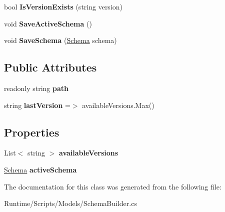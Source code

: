 \begin{DoxyCompactItemize}
bool {\bfseries Is\+Version\+Exists} (string version)
\item 
\mbox{\label{class_d_g_tools_1_1_database_1_1_schema_builder_a2045ed98663da0b8ee916312a54be068}} 
void {\bfseries Save\+Active\+Schema} ()
\item 
\mbox{\label{class_d_g_tools_1_1_database_1_1_schema_builder_aae993a4c832fb183ab8f4cf97c031e8b}} 
void {\bfseries Save\+Schema} (\mbox{\hyperlink{class_d_g_tools_1_1_database_1_1_schema}{Schema}} schema)
\end{DoxyCompactItemize}
\subsection*{Public Attributes}
\begin{DoxyCompactItemize}
\item 
\mbox{\label{class_d_g_tools_1_1_database_1_1_schema_builder_a690f6c686acdd1d98784cce924000ffb}} 
readonly string {\bfseries path}
\item 
\mbox{\label{class_d_g_tools_1_1_database_1_1_schema_builder_aae1bc924e123ac080407e9c482edc392}} 
string {\bfseries last\+Version} =$>$ available\+Versions.\+Max()
\end{DoxyCompactItemize}
\subsection*{Properties}
\begin{DoxyCompactItemize}
\item 
\mbox{\label{class_d_g_tools_1_1_database_1_1_schema_builder_ab65dce527d4aa79a911885269e9d123c}} 
List$<$ string $>$ {\bfseries available\+Versions}
\item 
\mbox{\label{class_d_g_tools_1_1_database_1_1_schema_builder_a160a44bb850795d73523f445d1005cbc}} 
\mbox{\hyperlink{class_d_g_tools_1_1_database_1_1_schema}{Schema}} {\bfseries active\+Schema}
\end{DoxyCompactItemize}


The documentation for this class was generated from the following file\+:\begin{DoxyCompactItemize}
\item 
Runtime/\+Scripts/\+Models/Schema\+Builder.\+cs\end{DoxyCompactItemize}
